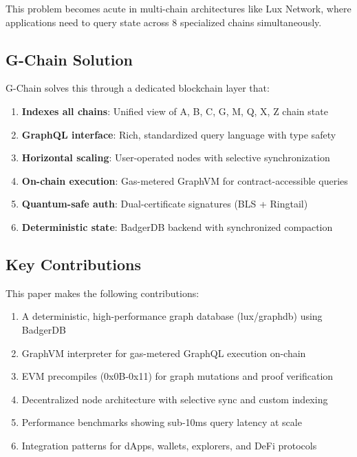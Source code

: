 \documentclass[11pt,a4paper]{article}
\begin{document}
This problem becomes acute in multi-chain architectures like Lux Network, where applications need to query state across 8 specialized chains simultaneously.

\subsection{G-Chain Solution}

G-Chain solves this through a dedicated blockchain layer that:

\begin{enumerate}
\item \textbf{Indexes all chains}: Unified view of A, B, C, G, M, Q, X, Z chain state
\item \textbf{GraphQL interface}: Rich, standardized query language with type safety
\item \textbf{Horizontal scaling}: User-operated nodes with selective synchronization
\item \textbf{On-chain execution}: Gas-metered GraphVM for contract-accessible queries
\item \textbf{Quantum-safe auth}: Dual-certificate signatures (BLS + Ringtail)
\item \textbf{Deterministic state}: BadgerDB backend with synchronized compaction
\end{enumerate}

\subsection{Key Contributions}

This paper makes the following contributions:

\begin{enumerate}
\item A deterministic, high-performance graph database (lux/graphdb) using BadgerDB
\item GraphVM interpreter for gas-metered GraphQL execution on-chain
\item EVM precompiles (0x0B-0x11) for graph mutations and proof verification
\item Decentralized node architecture with selective sync and custom indexing
\item Performance benchmarks showing sub-10ms query latency at scale
\item Integration patterns for dApps, wallets, explorers, and DeFi protocols
\end{enumerate}
\end{document}
